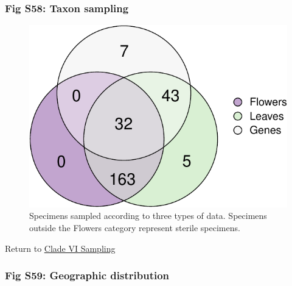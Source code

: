 \documentclass[
  11pt,
]{article}
\begin{document}
\hypertarget{fig-s58-taxon-sampling}{%
\subsubsection{Fig S58: Taxon sampling}\label{fig-s58-taxon-sampling}}

\begin{figure}

{\centering \includegraphics{Supplementary_Material_files/figure-latex/CladeVIVennDiagram-1} 

}

\caption{Specimens sampled according to three types of data. Specimens outside the Flowers category represent sterile specimens.}\label{fig:CladeVIVennDiagram}
\end{figure}

Return to \protect\hyperlink{sampling-6}{Clade VI Sampling}
\pagebreak

\hypertarget{fig-s59-geographic-distribution}{%
\subsubsection{Fig S59: Geographic distribution}\label{fig-s59-geographic-distribution}}
\end{document}
